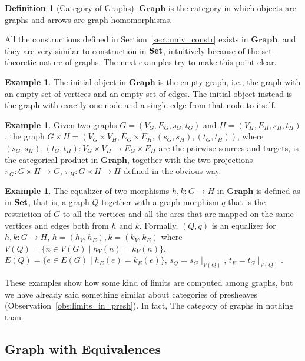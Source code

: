 \documentclass[a4paper, twoside,openright]{report}
\theoremstyle{plain}
\theoremstyle{definition}
\newtheorem{definition}[theorem]{Definition}
\newtheorem{example}[theorem]{Example}
\begin{document}
\begin{definition}[Category of Graphs]\label{def:cat_of_graph}
    $\mathbf{Graph}$ is the category in which objects are graphs and arrows are graph homomorphisms.
\end{definition}

All the constructions defined in Section~\ref{sect:univ_constr} exists in $\mathbf{Graph}$, and they are very similar to construction in $\mathbf{Set}$, intuitively because of the set-theoretic nature of graphs. The next examples try to make this point clear.

\begin{example}
    The initial object in $\mathbf{Graph}$ is the empty graph, i.e., the graph with an empty set of vertices and an empty set of edges. The initial object instead is the graph with exactly one node and a single edge from that node to itself.
\end{example}

\begin{example}
    Given two graphs $G = (V_G, E_G, s_G, t_G)$ and $H=(V_H, E_H, s_H, t_H)$, the graph $G \times H = (V_G\times V_H, E_G \times E_H, (s_G, s_H), (t_G, t_H))$, where $(s_G, s_H), (t_G, t_H):V_G\times V_H \rightarrow E_G \times E_H$ are the pairwise sources and targets, is the categorical product in $\mathbf{Graph}$, together with the two projections $\pi_G: G \times H \rightarrow G$, $\pi_H : G \times H \rightarrow H$ defined in the obvious way.
\end{example}

\begin{example}
    The equalizer of two morphisms $h, k: G \rightarrow H$ in $\mathbf{Graph}$ is defined as in $\mathbf{Set}$, that is,  a graph $Q$ together with a graph morphism $q$ that is the restriction of $G$ to all the vertices and all the arcs that are mapped on the same vertices and edges both from $h$ and $k$. Formally, $(Q, q)$ is an equalizer for $h, k: G \rightarrow H$, $h = (h_V, h_E), k = (k_V, k_E)$ where $V(Q) = \{ n \in V(G) \mid h_V(n) = k_V(n)\}$, $E(Q) = \{ e \in E(G) \mid h_E(e) = k_E(e)\}$, $s_Q = s_G \mid_{V(Q)}$, $t_E = t_G \mid_{V(Q)}$.
\end{example}

These examples show how some kind of limits are computed among graphs, but we have already said something similar about categories of presheaves (Observation~\ref{obs:limits_in_presh}). In fact, The category of graphs in nothing than 

\subsection{Graph with Equivalences}
\end{document}
